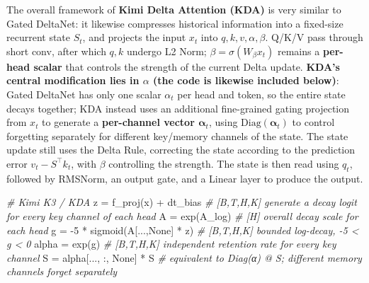 \documentclass[
  a4paper,
  10pt]{article}
\newenvironment{Shaded}{}{}
\newcommand{\CommentTok}[1]{\textcolor[rgb]{0.38,0.63,0.69}{\textit{#1}}}
\newcommand{\DecValTok}[1]{\textcolor[rgb]{0.25,0.63,0.44}{#1}}
\newcommand{\NormalTok}[1]{#1}
\newcommand{\OperatorTok}[1]{\textcolor[rgb]{0.40,0.40,0.40}{#1}}
\newcommand{\VariableTok}[1]{\textcolor[rgb]{0.10,0.09,0.49}{#1}}
\begin{document}
The overall framework of \textbf{Kimi Delta Attention (KDA)} is very
similar to Gated DeltaNet: it likewise compresses historical information
into a fixed-size recurrent state \(S_t\), and projects the input
\(x_t\) into \(q,k,v,\alpha,\beta\). Q/K/V pass through short conv,
after which \(q,k\) undergo L2 Norm; \(\beta=\sigma(W_\beta x_t)\)
remains a \textbf{per-head scalar} that controls the strength of the
current Delta update. \textbf{KDA's central modification lies in
\(\alpha\) (the code is likewise included below)}: Gated DeltaNet has
only one scalar \(\alpha_t\) per head and token, so the entire state
decays together; KDA instead uses an additional fine-grained gating
projection from \(x_t\) to generate a \textbf{per-channel vector
\(\boldsymbol{\alpha}_t\)}, using
\(\mathrm{Diag}(\boldsymbol{\alpha}_t)\) to control forgetting
separately for different key/memory channels of the state. The state
update still uses the Delta Rule, correcting the state according to the
prediction error \(v_t-S^\top k_t\), with \(\beta\) controlling the
strength. The state is then read using \(q_t\), followed by RMSNorm, an
output gate, and a Linear layer to produce the output.

\begin{Shaded}
\begin{Highlighting}[]
\CommentTok{\# Kimi K3 / KDA}
\NormalTok{z }\OperatorTok{=}\NormalTok{ f\_proj(x) }\OperatorTok{+}\NormalTok{ dt\_bias       }\CommentTok{\# [B,T,H,K] generate a decay logit for every key channel of each head}
\NormalTok{A }\OperatorTok{=}\NormalTok{ exp(A\_log)                }\CommentTok{\# [H] overall decay scale for each head}
\NormalTok{g }\OperatorTok{=} \OperatorTok{{-}}\DecValTok{5} \OperatorTok{*}\NormalTok{ sigmoid(A[...,}\VariableTok{None}\NormalTok{] }\OperatorTok{*}\NormalTok{ z)  }\CommentTok{\# [B,T,H,K] bounded log{-}decay, {-}5 \textless{} g \textless{} 0}
\NormalTok{alpha }\OperatorTok{=}\NormalTok{ exp(g)                }\CommentTok{\# [B,T,H,K] independent retention rate for every key channel}
\NormalTok{S }\OperatorTok{=}\NormalTok{ alpha[..., :, }\VariableTok{None}\NormalTok{] }\OperatorTok{*}\NormalTok{ S   }\CommentTok{\# equivalent to Diag(α) @ S; different memory channels forget separately}
\end{Highlighting}
\end{Shaded}
\end{document}
